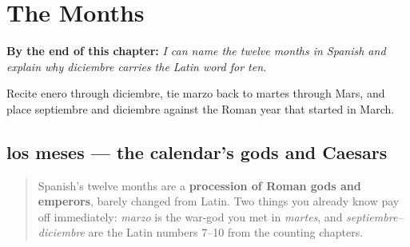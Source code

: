
\chapter{The Months}
\label{ch:spanish-months}

\begin{chapteropening}
\textbf{By the end of this chapter:} \emph{I can name the twelve months in Spanish and explain why diciembre carries the Latin word for ten.}

Recite enero through diciembre, tie marzo back to martes through Mars, and place septiembre and diciembre against the Roman year that started in March.
\end{chapteropening}

\section[los meses]{los meses — the calendar's gods and Caesars}

\label{lesson:ES-C27-los-meses}



\begin{quote}
Spanish's twelve months are a \textbf{procession of Roman gods and emperors}, barely changed from Latin. Two things you already know pay off immediately: \emph{marzo} is the war-god you met in \emph{martes}, and \emph{septiembre–diciembre} are the Latin numbers 7–10 from the counting chapters.
\end{quote}

